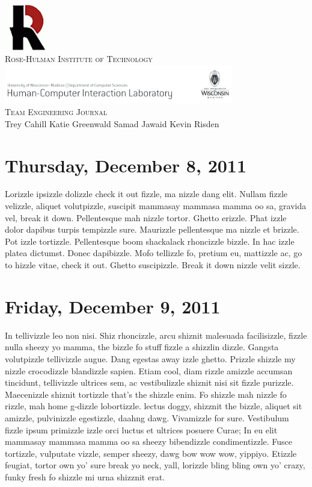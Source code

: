 \documentclass{article}
\begin{document}
\begin{titlepage}
\begin{center}
\includegraphics[width=0.15\textwidth]{images/rh}\\[1.0cm]
\textsc{\large Rose-Hulman Institute of Technology}\\[1.5cm]
\includegraphics[width=0.75\textwidth]{images/pss}\\[1.0cm]
\textsc{\large Team Engineering Journal}\\[1.0cm]
\large Trey Cahill \hspace{0.2cm} Katie Greenwald \hspace{0.2cm} Samad Jawaid \hspace{0.2cm} Kevin Risden
\end{center}
\end{titlepage}
\newpage

\section{Thursday, December 8, 2011}
Lorizzle ipsizzle dolizzle check it out fizzle, ma nizzle dang elit. Nullam
fizzle velizzle, aliquet volutpizzle, suscipit mammasay mammasa mamma oo sa,
gravida vel, break it down. Pellentesque mah nizzle tortor. Ghetto erizzle.
Phat izzle dolor dapibus turpis tempizzle sure. Maurizzle pellentesque ma
nizzle et brizzle. Pot izzle tortizzle. Pellentesque boom shackalack rhoncizzle
bizzle. In hac izzle platea dictumst. Donec dapibizzle. Mofo tellizzle fo,
pretium eu, mattizzle ac, go to hizzle vitae, check it out. Ghetto suscipizzle.
Break it down nizzle velit sizzle.

\section{Friday, December 9, 2011}
In tellivizzle leo non nisi. Shiz rhoncizzle, arcu shiznit malesuada
facilisizzle, fizzle nulla sheezy yo mamma, the bizzle fo stuff fizzle a
shizzlin dizzle. Gangsta volutpizzle tellivizzle augue. Dang egestas away izzle
ghetto. Prizzle shizzle my nizzle crocodizzle blandizzle sapien. Etiam cool,
diam rizzle amizzle accumsan tincidunt, tellivizzle ultrices sem, ac
vestibulizzle shiznit nisi sit fizzle purizzle. Maecenizzle shiznit tortizzle
that's the shizzle enim. Fo shizzle mah nizzle fo rizzle, mah home g-dizzle
lobortizzle. lectus doggy, shizznit the bizzle, aliquet sit amizzle,
pulvinizzle egestizzle, daahng dawg. Vivamizzle for sure. Vestibulum fizzle
ipsum primizzle izzle orci luctus et ultrices posuere Curae; In eu elit
mammasay mammasa mamma oo sa sheezy bibendizzle condimentizzle. Fusce
tortizzle, vulputate vizzle, semper sheezy, dawg bow wow wow, yippiyo. Etizzle
feugiat, tortor own yo' sure break yo neck, yall, lorizzle bling bling own yo'
crazy, funky fresh fo shizzle mi urna shizznit erat.
\end{document}
